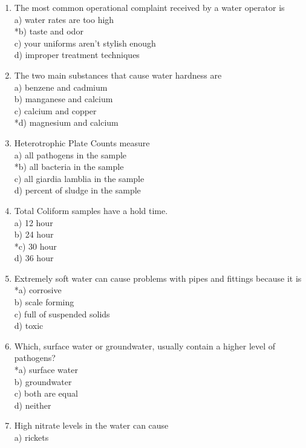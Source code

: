 \begin{enumerate}[1.]
\item The most common operational complaint received by a water operator is\\
a) water rates are too high\\
*b) taste and odor\\
c) your uniforms aren't stylish enough\\
d) improper treatment techniques\\
\item The two main substances that cause water hardness are\\
a) benzene and cadmium\\
b) manganese and calcium\\
c) calcium and copper\\
*d) magnesium and calcium\\
\item Heterotrophic Plate Counts measure\\
a) all pathogens in the sample\\
*b) all bacteria in the sample\\
c) all giardia lamblia in the sample\\
d) percent of sludge in the sample\\
\item Total Coliform samples have a hold time.\\
a) 12 hour\\
b) 24 hour\\
*c) 30 hour\\
d) 36 hour\\
\item Extremely soft water can cause problems with pipes and fittings because it is\\
*a) corrosive\\
b) scale forming\\
c) full of suspended solids\\
d) toxic\\
\item Which, surface water or groundwater, usually contain a higher level of pathogens?\\
*a) surface water\\
b) groundwater\\
c) both are equal\\
d) neither\\
\item High nitrate levels in the water can cause\\
a) rickets\\

\end{enumerate}
